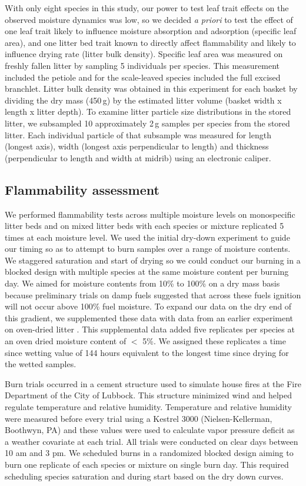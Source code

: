 \documentclass[letterpaper,12pt]{article}
\begin{document}
With only eight species in this study, our power to test leaf trait effects on
the observed moisture dynamics was low, so we decided \emph{a priori} to test
the effect of one leaf trait likely to influence moisture absorption and
adsorption (specific leaf area), and one litter bed trait known to directly
affect flammability and likely to influence drying rate (litter bulk density).
Specific leaf area was measured on freshly fallen litter by sampling 5
individuals per species. This measurement included the petiole and for the
scale-leaved species included the full excised branchlet. Litter bulk density
was obtained in this experiment for each basket by dividing the dry mass
(450\,g) by the estimated litter volume (basket width x length x litter depth).
To examine litter particle size distributions in the stored litter, we
subsampled 10 approximately 2\,g samples per species from the stored litter.
Each individual particle of that subsample was measured for length (longest
axis), width (longest axis perpendicular to length) and thickness
(perpendicular to length and width at midrib) using an electronic caliper.

\subsection*{Flammability assessment}

We performed flammability tests across multiple moisture levels on monospecific
litter beds and on mixed litter beds with each species or mixture replicated 5
times at each moisture level. We used the initial dry-down experiment to guide
our timing so as to attempt to burn samples over a range of moisture contents.
We staggered saturation and start of drying so we could conduct our burning in
a blocked design with multiple species at the same moisture content per burning
day. We aimed for moisture contents from 10\% to 100\% on a dry mass basis because
preliminary trials on damp fuels suggested that across these fuels ignition
will not occur above 100\% fuel moisture. To expand our data on the dry end of
this gradient, we supplemented these data with data from an earlier experiment
on oven-dried litter \citep{Magalhaes+Schwilk-2012}. This supplemental data
added five replicates per species at an oven dried moisture content of $<$ 5\%.
We assigned these replicates a time since wetting value of 144 hours equivalent
to the longest time since drying for the wetted samples.

Burn trials occurred in a cement structure used to simulate house fires at the
Fire Department of the City of Lubbock. This structure minimized wind and
helped regulate temperature and relative humidity. Temperature and relative
humidity were measured before every trial using a Kestrel 3000
(Nielsen-Kellerman, Boothwyn, PA) and these values were used to calculate vapor
pressure deficit as a weather covariate at each trial. All trials were
conducted on clear days between 10 am and 3 pm. We scheduled burns in a
randomized blocked design aiming to burn one replicate of each species or
mixture on single burn day. This required scheduling species saturation and
during start based on the dry down curves.
\end{document}
